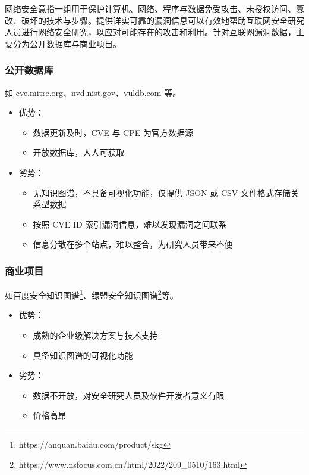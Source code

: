 \documentclass[a4paper,AutoFakeBold,oneside,12pt]{book}
\begin{document}
网络安全意指一组用于保护计算机、网络、程序与数据免受攻击、未授权访问、篡改、破坏的技术与步骤\cite{aftergood_cybersecurity_2017}。提供详实可靠的漏洞信息可以有效地帮助互联网安全研究人员进行网络安全研究，以应对可能存在的攻击和利用。针对互联网漏洞数据，主要分为公开数据库与商业项目。

\subsubsection{公开数据库}

如 cve.mitre.org、nvd.nist.gov、vuldb.com 等。

\begin{itemize}
	\item 优势：
	      \begin{itemize}
		      \item 数据更新及时，CVE 与 CPE 为官方数据源
		      \item 开放数据库，人人可获取
	      \end{itemize}
	\item 劣势：
	      \begin{itemize}
		      \item 无知识图谱，不具备可视化功能，仅提供 JSON 或 CSV 文件格式存储关系型数据
		      \item 按照 CVE ID 索引漏洞信息，难以发现漏洞之间联系
		      \item 信息分散在多个站点，难以整合，为研究人员带来不便
	      \end{itemize}
\end{itemize}

\subsubsection{商业项目}

如百度安全知识图谱\footnote{https://anquan.baidu.com/product/skg}、绿盟安全知识图谱\footnote{https://www.nsfocus.com.cn/html/2022/209{\_}0510/163.html}等。

\begin{itemize}
	\item 优势：
	      \begin{itemize}
		      \item 成熟的企业级解决方案与技术支持
		      \item 具备知识图谱的可视化功能
	      \end{itemize}
	\item 劣势：
	      \begin{itemize}
		      \item 数据不开放，对安全研究人员及软件开发者意义有限
		      \item 价格高昂
	      \end{itemize}
\end{itemize}
\end{document}
